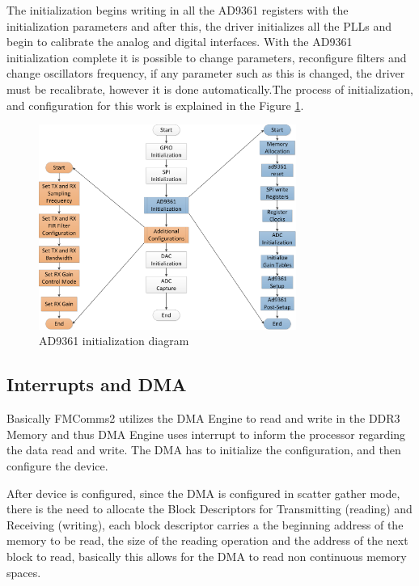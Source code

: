 The initialization begins writing in all the AD9361 registers with the
initialization parameters and after this, the driver initializes all the PLLs
and begin to calibrate the analog and digital interfaces. With the AD9361
initialization complete it is possible to change parameters, reconfigure filters
and  change oscillators frequency, if any parameter such as this is changed, the
driver must be recalibrate, however it is done automatically.The process of
initialization, and configuration for this work is explained in the Figure
\ref{fig:ad9361init}.


\begin{figure}[htbp]
    \centering
    \includegraphics[width=0.75\textwidth]{./figures/ad9361_driver}
    \caption{ AD9361 initialization diagram
    \label{fig:ad9361init}}
\end{figure}

\subsection{Interrupts and DMA}

Basically FMComms2 utilizes the DMA Engine to read and write in the DDR3 Memory
and thus DMA Engine uses interrupt to inform the processor regarding the data
read and write. The DMA has to initialize the configuration, and then configure
the device.

After device is configured, since the DMA is configured in scatter gather mode,
there is the need to allocate the Block Descriptors for Transmitting (reading)
and Receiving (writing), each block descriptor carries a the beginning address
of the memory to be read, the size of the reading operation and the address of
the next block to read, basically this allows for the DMA to read non continuous
memory spaces.

